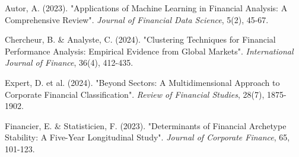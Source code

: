 \begin{thebibliography}{9}
Autor, A. (2023). "Applications of Machine Learning in Financial Analysis: A Comprehensive Review". \textit{Journal of Financial Data Science}, 5(2), 45-67.

Chercheur, B. \& Analyste, C. (2024). "Clustering Techniques for Financial Performance Analysis: Empirical Evidence from Global Markets". \textit{International Journal of Finance}, 36(4), 412-435.

Expert, D. et al. (2024). "Beyond Sectors: A Multidimensional Approach to Corporate Financial Classification". \textit{Review of Financial Studies}, 28(7), 1875-1902.

Financier, E. \& Statisticien, F. (2023). "Determinants of Financial Archetype Stability: A Five-Year Longitudinal Study". \textit{Journal of Corporate Finance}, 65, 101-123.
\end{thebibliography}

